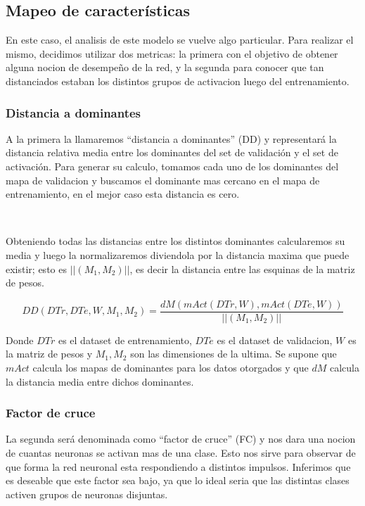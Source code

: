 \documentclass[informe.tex]{subfiles}
\begin{document}
      
     \FloatBarrier
    \subsection{Mapeo de características}
    
      En este caso, el analisis de este modelo se vuelve algo particular. Para realizar el mismo, decidimos utilizar dos metricas: la primera con el objetivo de obtener alguna nocion de desempe\~no de la red, y la segunda para conocer que tan distanciados estaban los distintos grupos de activacion luego del entrenamiento.
      
      
      \subsubsection{Distancia a dominantes}
      
      A la primera la llamaremos ``distancia a dominantes'' (DD) y representar\'a la distancia relativa media entre los dominantes del set de validaci\'on y el set de activaci\'on. Para generar su calculo, tomamos cada uno de los dominantes del mapa de validacion y buscamos el dominante mas cercano en el mapa de entrenamiento, en el mejor caso esta distancia es cero. 
      
      ~
      
      Obteniendo todas las distancias entre los distintos dominantes calcularemos su media y luego la normalizaremos diviendola por la distancia maxima que puede existir; esto es $||(M_1,M_2)||$, es decir la distancia entre las esquinas de la matriz de pesos.
      
      $$DD(DTr, DTe, W, M_1, M_2) = \frac{dM(mAct(DTr,W), mAct(DTe,W))}{||(M_1,M_2)||}$$
      
      Donde $DTr$ es el dataset de entrenamiento, $DTe$ es el dataset de validacion, $W$ es la matriz de pesos y $M_1, M_2$  son las dimensiones de la ultima. Se supone que $mAct$ calcula los mapas de dominantes para los datos otorgados y que $dM$ calcula la distancia media entre dichos dominantes.
      
      \subsubsection{Factor de cruce}
      
      La segunda ser\'a denominada como ``factor de cruce'' (FC) y nos dara una nocion de cuantas neuronas se activan mas de una clase. Esto nos sirve para observar de que forma la red neuronal esta respondiendo a distintos impulsos. Inferimos que es deseable que este factor sea bajo, ya que lo ideal seria que las distintas clases activen grupos de neuronas disjuntas.
      
\end{document}
